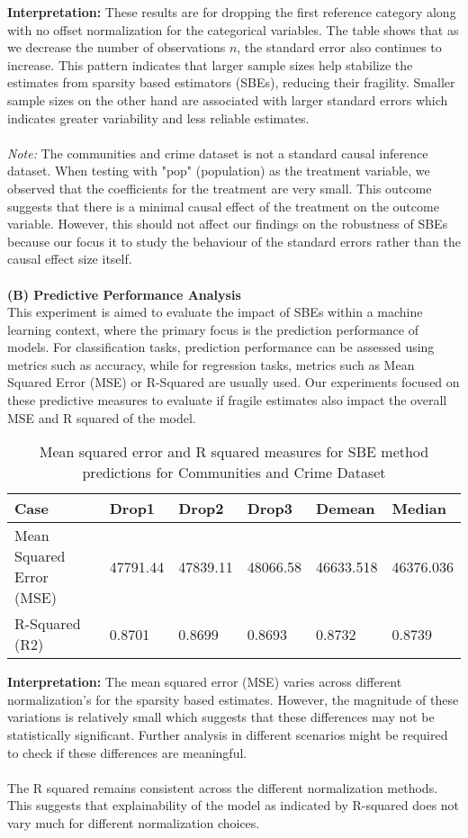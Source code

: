 \textbf{Interpretation:} These results are for dropping the first reference category along with no offset normalization for the categorical variables. The table shows that as we decrease the number of observations $n$, the standard error also continues to increase. This pattern indicates that larger sample sizes help stabilize the estimates from sparsity based estimators (SBEs), reducing their fragility. Smaller sample sizes on the other hand are associated with larger standard errors which indicates greater variability and less reliable estimates. \\
\\
\textit{Note:} The communities and crime dataset is not a standard causal inference dataset. When testing with "pop" (population) as the treatment variable, we observed that the coefficients for the treatment are very small. This outcome suggests that there is a minimal causal effect of the treatment on the outcome variable. However, this should not affect our findings on the robustness of SBEs because our focus it to study the behaviour of the standard errors rather than the causal effect size itself.\\
\\
\textbf{(B) Predictive Performance Analysis }\\
This experiment is aimed to evaluate the impact of SBEs within a machine learning context, where the primary focus is the prediction performance of models. For classification tasks, prediction performance can be assessed using metrics such as accuracy, while for regression tasks, metrics such as Mean Squared Error (MSE) or R-Squared are usually used. Our experiments focused on these predictive measures to evaluate if fragile estimates also impact the overall MSE and R squared of the model.
\begin{table}[h!]
\renewcommand{\arraystretch}{1.5}
\centering
\begin{tabular}{||l l l l l l||} 
 \hline
 \hline
 Case & Drop1 & Drop2 & Drop3 & Demean & Median \\ [0.5ex] 
 \hline \hline
 Mean Squared Error (MSE) & 47791.44 & 47839.11 & 48066.58 & 46633.518 & 46376.036 \\ 
 R-Squared (R2) & 0.8701 & 0.8699 & 0.8693 & 0.8732 & 0.8739 \\
 \hline \hline
\end{tabular}
\caption{Mean squared error and R squared measures for SBE method predictions for Communities and Crime Dataset}
\label{table:1}
\end{table}

\textbf{Interpretation:} 
The mean squared error (MSE) varies across different normalization's for the sparsity based estimates. However, the magnitude of these variations is relatively small which suggests that these differences may not be statistically significant. Further analysis in different scenarios might be required to check if these differences are meaningful. \\
\\
The R squared remains consistent across the different normalization methods. This suggests that explainability of the model as indicated by R-squared does not vary much for different normalization choices. 

